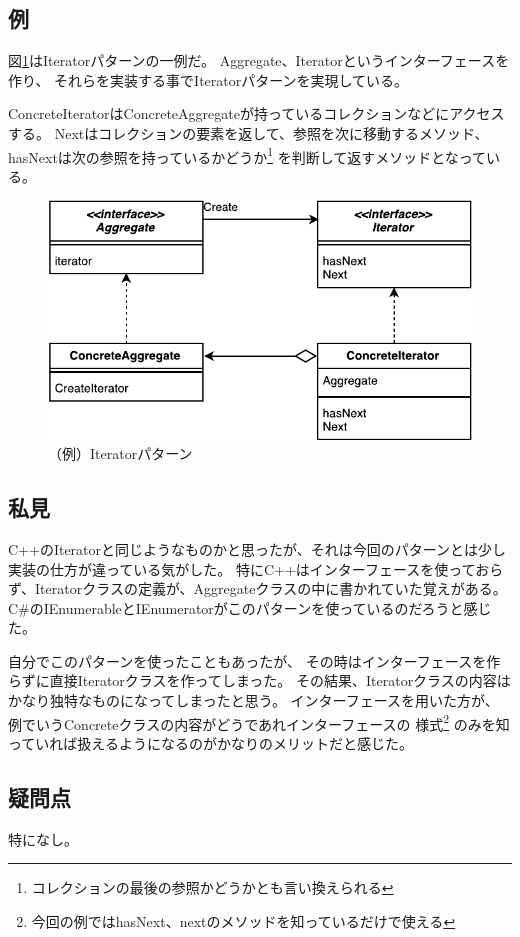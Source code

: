 \documentclass[11pt]{jsarticle}
\begin{document}
	\subsection{例}
		図\ref{fig::iterator}はIteratorパターンの一例だ。
		Aggregate、Iteratorというインターフェースを作り、
		それらを実装する事でIteratorパターンを実現している。
		
		ConcreteIteratorはConcreteAggregateが持っているコレクションなどにアクセスする。
		Nextはコレクションの要素を返して、参照を次に移動するメソッド、
		hasNextは次の参照を持っているかどうか\footnote{コレクションの最後の参照かどうかとも言い換えられる}
		を判断して返すメソッドとなっている。
	
		\begin{figure}[htbp]
			\centering
			\includegraphics[width=0.7\hsize]{IteratorPattern-crop.pdf}
			\caption{（例）Iteratorパターン}\label{fig::iterator}
		\end{figure}
		
	\subsection{私見}
		C++のIteratorと同じようなものかと思ったが、それは今回のパターンとは少し実装の仕方が違っている気がした。
		特にC++はインターフェースを使っておらず、Iteratorクラスの定義が、Aggregateクラスの中に書かれていた覚えがある。
		C\#のIEnumerableとIEnumeratorがこのパターンを使っているのだろうと感じた。
		
		自分でこのパターンを使ったこともあったが、
		その時はインターフェースを作らずに直接Iteratorクラスを作ってしまった。
		その結果、Iteratorクラスの内容はかなり独特なものになってしまったと思う。
		インターフェースを用いた方が、例でいうConcreteクラスの内容がどうであれインターフェースの
		様式\footnote{今回の例ではhasNext、nextのメソッドを知っているだけで使える}
		のみを知っていれば扱えるようになるのがかなりのメリットだと感じた。
	\subsection{疑問点}
		特になし。
\end{document}
